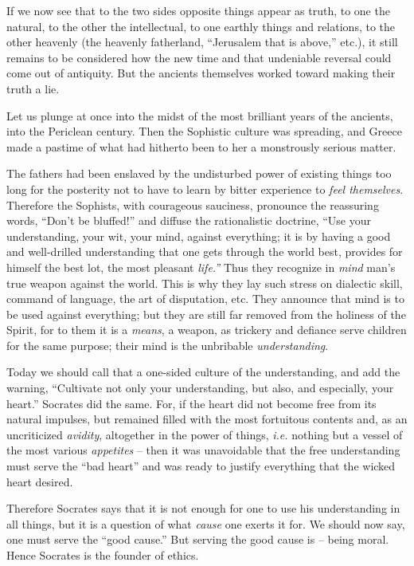 \documentclass[12pt,a4paper]{book}
\begin{document}
If we now see that to the two sides opposite things appear as truth, to one 
the natural, to the other the intellectual, to one earthly things and 
relations, to the other heavenly (the heavenly fatherland, ``Jerusalem that 
is above,'' etc.), it still remains to be considered how the new time and 
that undeniable reversal could come out of antiquity. But the ancients 
themselves worked toward making their truth a lie.

Let us plunge at once into the midst of the most brilliant years of the 
ancients, into the Periclean century. Then the Sophistic culture was 
spreading, and Greece made a pastime of what had hitherto been to her a 
monstrously serious matter.

The fathers had been enslaved by the undisturbed power of existing things too 
long for the posterity not to have to learn by bitter experience to 
\textit{feel themselves}. Therefore the Sophists, with courageous sauciness, 
pronounce the reassuring words, ``Don't be bluffed!'' and diffuse the 
rationalistic doctrine, ``Use your understanding, your wit, your mind, 
against everything; it is by having a good and well-drilled understanding that 
one gets through the world best, provides for himself the best lot, the most 
pleasant \textit{life.''} Thus they recognize in \textit{mind} man's true 
weapon against the world. This is why they lay such stress on dialectic skill, 
command of language, the art of disputation, etc. They announce that mind is 
to be used against everything; but they are still far removed from the 
holiness of the Spirit, for to them it is a \textit{means}, a weapon, as 
trickery and defiance serve children for the same purpose; their mind is the 
unbribable \textit{understanding}.

Today we should call that a one-sided culture of the understanding, and add 
the warning, ``Cultivate not only your understanding, but also, and 
especially, your heart.'' Socrates did the same. For, if the heart did not 
become free from its natural impulses, but remained filled with the most 
fortuitous contents and, as an uncriticized \textit{avidity}, altogether in 
the power of things, \textit{i.e.} nothing but a vessel of the most various 
\textit{appetites} -- then it was unavoidable that the free understanding must 
serve the ``bad heart'' and was ready to justify everything that the wicked 
heart desired.

Therefore Socrates says that it is not enough for one to use his understanding 
in all things, but it is a question of what \textit{cause} one exerts it for. 
We should now say, one must serve the ``good cause.'' But serving the good 
cause is -- being moral. Hence Socrates is the founder of ethics.
\end{document}
